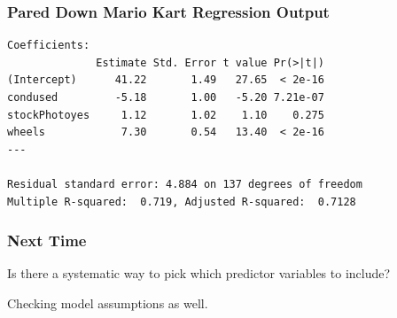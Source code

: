 \documentclass[handout]{beamer}
\begin{document}
\begin{frame}[fragile]
\frametitle{Pared Down Mario Kart Regression Output}

\begin{small}
\begin{verbatim}
Coefficients:
              Estimate Std. Error t value Pr(>|t|)    
(Intercept)      41.22       1.49   27.65  < 2e-16
condused         -5.18       1.00   -5.20 7.21e-07
stockPhotoyes     1.12       1.02    1.10    0.275    
wheels            7.30       0.54   13.40  < 2e-16
---

Residual standard error: 4.884 on 137 degrees of freedom
Multiple R-squared:  0.719,	Adjusted R-squared:  0.7128 
\end{verbatim}
\end{small}

\end{frame}


\begin{frame}[fragile]
\frametitle{Next Time}

Is there a systematic way to pick which predictor variables to include?

\vspace{0.5cm}

Checking model assumptions as well.  

\end{frame}
\end{document}
